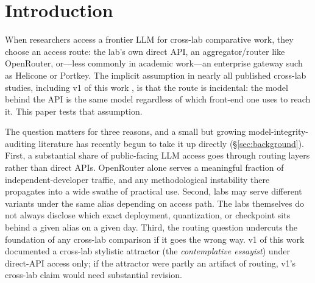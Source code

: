 \documentclass[11pt,a4paper]{article}
\begin{document}
\tableofcontents

\section{Introduction}
\label{sec:introduction}

When researchers access a frontier LLM for cross-lab comparative work, they choose an access route: the lab's own direct API, an aggregator/router like OpenRouter, or---less commonly in academic work---an enterprise gateway such as Helicone or Portkey. The implicit assumption in nearly all published cross-lab studies, including v1 of this work \citep{tenner2026convergent}, is that the route is incidental: the model behind the API is the same model regardless of which front-end one uses to reach it. This paper tests that assumption.

The question matters for three reasons, and a small but growing model-integrity-auditing literature has recently begun to take it up directly (\S\ref{sec:background}). First, a substantial share of public-facing LLM access goes through routing layers rather than direct APIs. OpenRouter alone serves a meaningful fraction of independent-developer traffic, and any methodological instability there propagates into a wide swathe of practical use. Second, labs may serve different variants under the same alias depending on access path. The labs themselves do not always disclose which exact deployment, quantization, or checkpoint sits behind a given alias on a given day. Third, the routing question undercuts the foundation of any cross-lab comparison if it goes the wrong way. v1 of this work documented a cross-lab stylistic attractor (the \emph{contemplative essayist}) under direct-API access only; if the attractor were partly an artifact of routing, v1's cross-lab claim would need substantial revision.
\end{document}
